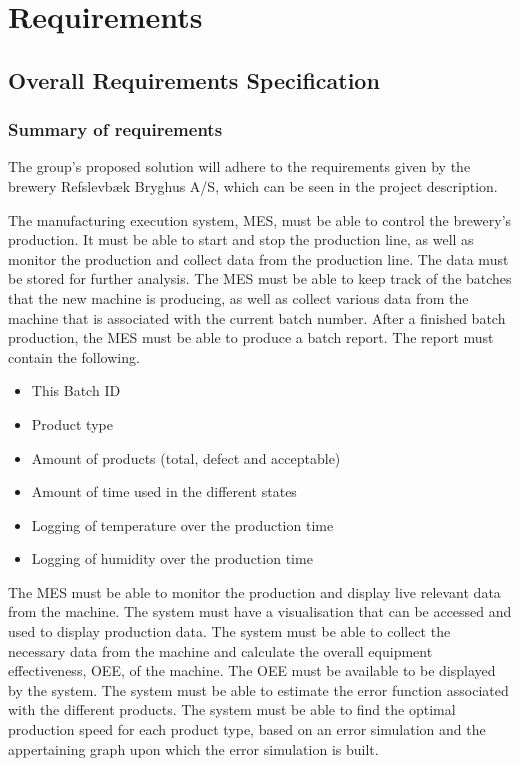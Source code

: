 \section{Requirements}

\subsection{Overall Requirements Specification}
\subsubsection{Summary of requirements}
The group's proposed solution will adhere to the requirements given by the
brewery Refslevbæk Bryghus A/S, which can be seen in the project description.

The manufacturing execution system, MES, must be able to control the brewery’s production.
It must be able to start and stop the production line,
as well as monitor the production and collect data from the production line.
The data must be stored for further analysis.
The MES must be able to keep track of the batches that the new machine is producing,
as well as collect various data from the machine that is associated with the current batch number.
After a finished batch production, the MES must be able to produce a batch report.
The report must contain the following.

\begin{itemize}
    \item This Batch ID
    \item Product type
    \item Amount of products (total, defect and acceptable)
    \item Amount of time used in the different states
    \item Logging of temperature over the production time
    \item Logging of humidity over the production time
\end{itemize}

The MES must be able to monitor the production and display live relevant data
from the machine. The system must have a
visualisation that can be accessed and used to display production data. The
system must be able to collect the necessary data from the machine and calculate
the overall equipment effectiveness, OEE, of the machine. The OEE must
be available to be displayed by the system. The system must be able to estimate
the error function associated with the different products. The system must be
able to find the optimal production speed for each product type, based on an
error simulation and the appertaining graph upon which the error simulation is
built.

